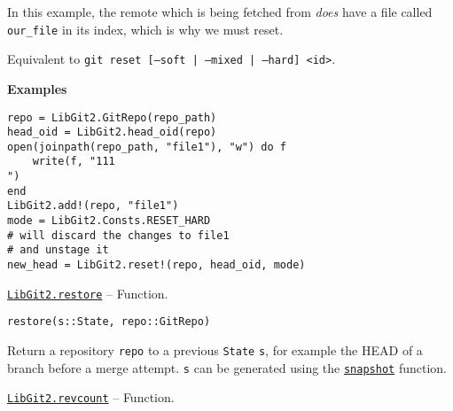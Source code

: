 \begin{adjustwidth}{2em}{0pt}
In this example, the remote which is being fetched from \emph{does} have a file called \texttt{our\_file} in its index, which is why we must reset.

Equivalent to \texttt{git reset [--soft | --mixed | --hard] <id>}.

\textbf{Examples}


\begin{verbatim}
repo = LibGit2.GitRepo(repo_path)
head_oid = LibGit2.head_oid(repo)
open(joinpath(repo_path, "file1"), "w") do f
    write(f, "111
")
end
LibGit2.add!(repo, "file1")
mode = LibGit2.Consts.RESET_HARD
# will discard the changes to file1
# and unstage it
new_head = LibGit2.reset!(repo, head_oid, mode)
\end{verbatim}



\end{adjustwidth}
\hypertarget{1068934750891016732}{}
\hyperlink{1068934750891016732}{\texttt{LibGit2.restore}}  -- {Function.}

\begin{adjustwidth}{2em}{0pt}


\begin{verbatim}
restore(s::State, repo::GitRepo)
\end{verbatim}

Return a repository \texttt{repo} to a previous \texttt{State} \texttt{s}, for example the HEAD of a branch before a merge attempt. \texttt{s} can be generated using the \hyperlink{5664620894068288269}{\texttt{snapshot}} function.



\end{adjustwidth}
\hypertarget{3220704891875596639}{}
\hyperlink{3220704891875596639}{\texttt{LibGit2.revcount}}  -- {Function.}

